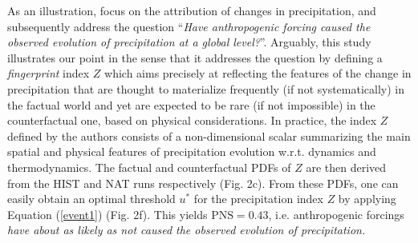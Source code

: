 \documentclass[12pt]{article}
\newcommand{\PNS}{\textrm{PNS}}
\begin{document}
As an illustration, \cite{MB13} focus on the attribution of changes in precipitation, and subsequently address the question ``\textit{Have anthropogenic forcing caused the observed evolution of precipitation at a global level?}''. Arguably, this study illustrates our point in the sense that it addresses the question by defining a \textit{fingerprint} index $Z$ which aims precisely at reflecting the features of the change in precipitation that are thought to materialize frequently (if not systematically) in the factual world and yet are expected to be rare (if not impossible) in the counterfactual one, based on physical considerations. %
In practice, the index $Z$ defined by the authors consists of a non-dimensional scalar summarizing the main spatial and physical features of precipitation evolution w.r.t. dynamics and thermodynamics. The factual and counterfactual PDFs of $Z$ are then derived from the HIST and NAT runs respectively (Fig. 2c). %
From these PDFs, one can easily obtain an optimal threshold $u^*$ for the precipitation index $Z$ by applying Equation (\ref{event1}) (Fig. 2f). This yields $\PNS=0.43$, i.e. anthropogenic forcings \textit{have about as likely as not caused the observed evolution of precipitation.}
\end{document}
